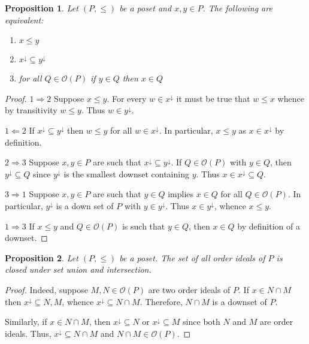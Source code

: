 \documentclass[a4paper]{article}
\newcommand{\Ocal}{\mathcal{O}}
\newtheorem{prop}{Proposition}
\begin{document}
\begin{prop} Let $(P,\leq)$ be a poset and $x,y\in P$. The following are equivalent: \begin{enumerate}
	\item $x\leq y$
	\item $x^\downarrow\subseteq y^\downarrow$
	\item for all $Q\in \Ocal(P)$ if $y\in Q$ then $x\in Q$
\end{enumerate}
\end{prop}

\begin{proof}
$1 \Rightarrow 2$ Suppose $x\leq y$. For every $w\in x^\downarrow$ it must be true that $w\leq x$ whence by transitivity $w\leq y$. Thus $w\in y^\downarrow$.

$1 \Leftarrow 2$ If $x^\downarrow\subseteq y^\downarrow$ then $w\leq y$ for all $w\in x^\downarrow$. In particular, $x\leq y$ as $x\in x^\downarrow$ by definition.

$2 \Rightarrow 3$ Suppose $x,y\in P$ are such that $x^\downarrow\subseteq y^\downarrow$. If $Q\in \Ocal(P)$ with $y\in Q$, then $y^\downarrow\subseteq Q$ since $y^\downarrow$ is the smallest downset containing $y$. Thus $x\in x^\downarrow\subseteq Q$.

$3 \Rightarrow 1$ Suppose $x,y\in P$ are such that $y\in Q$ implies $x\in Q$ for all $Q\in \Ocal(P)$. In particular, $y^\downarrow$ is a down set of $P$ with $y\in y^\downarrow$. Thus $x\in y^\downarrow$, whence $x\leq y$.

$1 \Rightarrow 3$ If $x\leq y$ and $Q\in \Ocal(P)$ is such that $y\in Q$, then $x\in Q$ by definition of a downset.
\end{proof}

\begin{prop} Let $(P,\leq)$ be a poset. The set of all order ideals of $P$ is closed under set union and intersection.
\end{prop}

\begin{proof}
Indeed, suppose $M,N\in \Ocal(P)$ are two order ideals of $P$. If $x\in N\cap M$ then $x^\downarrow \subseteq N,M$, whence $x^\downarrow\subseteq N\cap M$. Therefore, $N\cap M$ is a downset of $P$.

Similarly, if $x\in N\cap M$, then $x^\downarrow\subseteq N$ or $x^\downarrow\subseteq M$ since both $N$ and $M$ are order ideals. Thus, $x^\downarrow\subseteq N\cap M$ and $N\cap M \in \Ocal(P)$. 
\end{proof}
\end{document}
